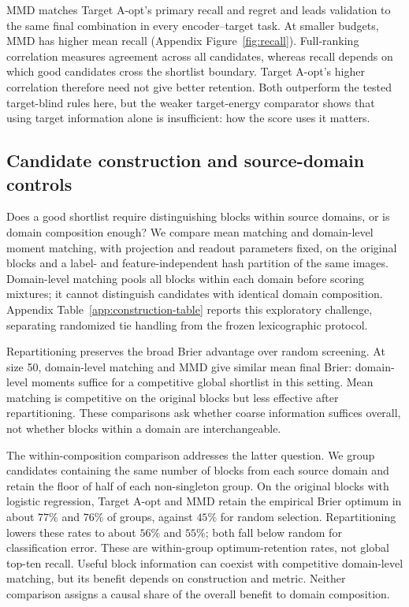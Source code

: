 \begin{table}[t]
\centering
\caption{The original DomainNet study retains $s=227$ of 455 combinations. Means average encoders within six target domains. Recall concerns the test Brier top ten; regret is relative to oracle Brier. Spearman measures agreement between the complete screening and test-loss rankings.}
\label{tab:primary}

\end{table}

MMD matches Target A-opt's primary recall and regret and leads validation to the same final combination in every encoder--target task. At smaller budgets, MMD has higher mean recall (Appendix Figure~\ref{fig:recall}). Full-ranking correlation measures agreement across all candidates, whereas recall depends on which good candidates cross the shortlist boundary. Target A-opt's higher correlation therefore need not give better retention. Both outperform the tested target-blind rules here, but the weaker target-energy comparator shows that using target information alone is insufficient: how the score uses it matters.

\subsection{Candidate construction and source-domain controls}
\label{sec:construction}
Does a good shortlist require distinguishing blocks within source domains, or is domain composition enough? We compare mean matching and domain-level moment matching, with projection and readout parameters fixed, on the original blocks and a label- and feature-independent hash partition of the same images. Domain-level matching pools all blocks within each domain before scoring mixtures; it cannot distinguish candidates with identical domain composition. Appendix Table~\ref{app:construction-table} reports this exploratory challenge, separating randomized tie handling from the frozen lexicographic protocol.

Repartitioning preserves the broad Brier advantage over random screening. At size 50, domain-level matching and MMD give similar mean final Brier: domain-level moments suffice for a competitive global shortlist in this setting. Mean matching is competitive on the original blocks but less effective after repartitioning. These comparisons ask whether coarse information suffices overall, not whether blocks within a domain are interchangeable.

The within-composition comparison addresses the latter question. We group candidates containing the same number of blocks from each source domain and retain the floor of half of each non-singleton group. On the original blocks with logistic regression, Target A-opt and MMD retain the empirical Brier optimum in about $77\%$ and $76\%$ of groups, against $45\%$ for random selection. Repartitioning lowers these rates to about $56\%$ and $55\%$; both fall below random for classification error. These are within-group optimum-retention rates, not global top-ten recall. Useful block information can coexist with competitive domain-level matching, but its benefit depends on construction and metric. Neither comparison assigns a causal share of the overall benefit to domain composition.

